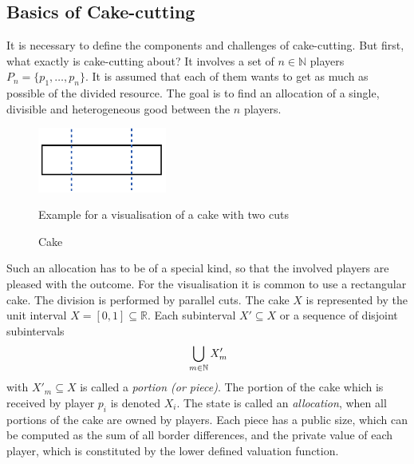 \subsection{Basics of Cake-cutting}
It is necessary to define the components and challenges of cake-cutting. But first, what exactly is cake-cutting about? It involves a set of $n \in \mathbb{N}$ players $P_n=\{p_1,\ldots,p_n\}$. It is assumed that each of them wants to get as much as possible of the divided resource. The goal is to find an allocation of a single, divisible and heterogeneous good between the $n$ players.  
	\begin{figure}[h]
		\centering
 		 \includegraphics[width=120pt]{kek.pdf}
   \caption{Cake}Example for a visualisation of a cake with two cuts
  	 \end{figure} 
Such an allocation has to be of a special kind, so that the involved players are pleased with the outcome. For the visualisation it is common to use a rectangular cake. The division is performed by parallel cuts. The cake $X$ is represented by the unit interval $X=[0,1] \subseteq \mathbb{R}$. Each subinterval $X'\subseteq X$ or a sequence of disjoint subintervals $$\sideset{}{ }\bigcup\limits_{m\in\mathbb{N}}X'_m$$
with $X'_m\subseteq X$ is called a \emph{portion (or piece)}. The portion of the cake which is received by player $p_i$ is denoted $X_i$. The state is called an \emph{allocation}, when all portions of the cake are owned by players. Each piece has a public size, which can be computed as the sum of all border differences, and the private value of each player, which is constituted by the lower defined valuation function.\\

